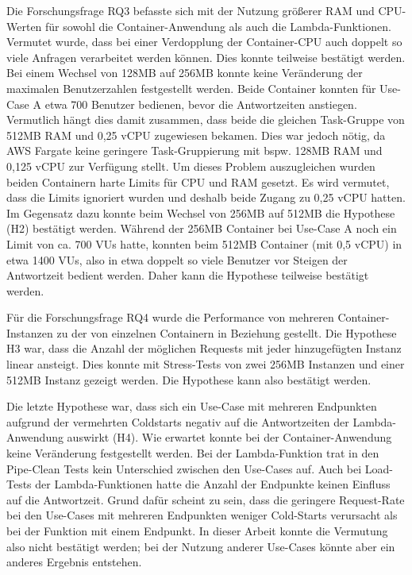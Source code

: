 Die Forschungsfrage RQ3 befasste sich mit der Nutzung größerer RAM und CPU-Werten für sowohl die Container-Anwendung als auch die Lambda-Funktionen. Vermutet wurde, dass bei einer Verdopplung der Container-CPU auch doppelt so viele Anfragen verarbeitet werden können. Dies konnte teilweise bestätigt werden. Bei einem Wechsel von 128MB auf 256MB konnte keine Veränderung der maximalen Benutzerzahlen festgestellt werden. Beide Container konnten für Use-Case A etwa 700 Benutzer bedienen, bevor die Antwortzeiten anstiegen. Vermutlich hängt dies damit zusammen, dass beide die gleichen Task-Gruppe von 512MB RAM und 0,25 vCPU zugewiesen bekamen. Dies war jedoch nötig, da AWS Fargate keine geringere Task-Gruppierung mit bspw. 128MB RAM und 0,125 vCPU zur Verfügung stellt. Um dieses Problem auszugleichen wurden beiden Containern harte Limits für CPU und RAM gesetzt. Es wird vermutet, dass die Limits ignoriert wurden und deshalb beide Zugang zu 0,25 vCPU hatten. Im Gegensatz dazu konnte beim Wechsel von 256MB auf 512MB die Hypothese (H2) bestätigt werden. Während der 256MB Container bei Use-Case A noch ein Limit von ca. 700 VUs hatte, konnten beim 512MB Container (mit 0,5 vCPU) in etwa 1400 VUs, also in etwa doppelt so viele Benutzer vor Steigen der Antwortzeit bedient werden. Daher kann die Hypothese teilweise bestätigt werden.

Für die Forschungsfrage RQ4 wurde die Performance von mehreren Container-Instanzen zu der von einzelnen Containern in Beziehung gestellt. Die Hypothese H3 war, dass die Anzahl der möglichen Requests mit jeder hinzugefügten Instanz linear ansteigt. Dies konnte mit Stress-Tests von zwei 256MB Instanzen und einer 512MB Instanz gezeigt werden. Die Hypothese kann also bestätigt werden.

Die letzte Hypothese war, dass sich ein Use-Case mit mehreren Endpunkten aufgrund der vermehrten Coldstarts negativ auf die Antwortzeiten der Lambda-Anwendung auswirkt (H4). Wie erwartet konnte bei der Container-Anwendung keine Veränderung festgestellt werden. Bei der Lambda-Funktion trat in den Pipe-Clean Tests kein Unterschied zwischen den Use-Cases auf. Auch bei Load-Tests der Lambda-Funktionen hatte die Anzahl der Endpunkte keinen Einfluss auf die Antwortzeit. Grund dafür scheint zu sein, dass die geringere Request-Rate bei den Use-Cases mit mehreren Endpunkten weniger Cold-Starts verursacht als bei der Funktion mit einem Endpunkt. In dieser Arbeit konnte die Vermutung also nicht bestätigt werden; bei der Nutzung anderer Use-Cases könnte aber ein anderes Ergebnis entstehen.

